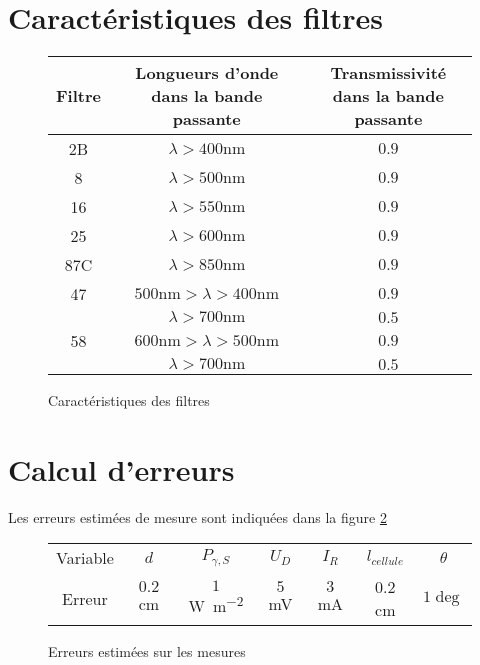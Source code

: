 \section{Caractéristiques des filtres}

\begin{figure}[H]
\centering
\begin{tabulary}{0.8\linewidth}{C C C}
    \toprule
    Filtre & Longueurs d'onde dans la bande passante & Transmissivité dans la bande passante \\
    \midrule
    2B  & $\lambda > 400 \unit{\nano \metre}$ & $0.9$ \\
    8   & $\lambda > 500 \unit{\nano \metre}$ & $0.9$ \\
    16  & $\lambda > 550 \unit{\nano \metre}$ & $0.9$ \\
    25  & $\lambda > 600 \unit{\nano \metre}$ & $0.9$ \\
    87C & $\lambda > 850 \unit{\nano \metre}$ & $0.9$ \\
    47  & $500 \unit{\nano \metre} > \lambda > 400 \unit{\nano \metre}$ & $0.9$ \\
        & $\lambda > 700 \unit{\nano \metre}$ & $0.5$ \\
    58  & $600 \unit{\nano \metre} > \lambda > 500 \unit{\nano \metre}$ & $0.9$ \\
        & $\lambda > 700 \unit{\nano \metre}$ & $0.5$ \\
    \bottomrule
    \end{tabulary}
    \caption{Caractéristiques des filtres \cite{notice}}
    \label{tab:filters}
\end{figure}

\section{Calcul d'erreurs}

Les erreurs estimées de mesure sont indiquées dans la figure \ref{tab:erreurs}

\begin{figure}[H]
    \centering
    \begin{tabulary}{0.7\linewidth}{C C C C C C C}
        \toprule
        Variable & \(d\)      & \(P_{\gamma,S}\) & \(U_D\)   & \(I_R\)  & \(l_{cellule}\) & \(\theta\) \\
        Erreur   & \(0.2\) cm & \(1\) \unit{\watt \per \square \meter}        & \(5\) \unit{\milli\volt} & \(3\) \unit{\milli\ampere} & 0.2 \unit{\centi\meter}      & \(1 \deg\) \\
        \bottomrule
    \end{tabulary}
    \caption{Erreurs estimées sur les mesures}
    \label{tab:erreurs}
\end{figure}

